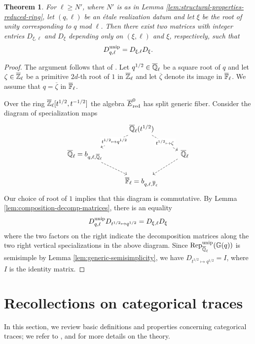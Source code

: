 \documentclass[a4paper, 10pt, oneside, reqno]{amsart}
\theoremstyle{plain}
\newtheorem{thm}{Theorem}[subsection]
\theoremstyle{definition}
\theoremstyle{remark}
\newcommand{\Gbb}{\mathbb{G}}
\begin{document}
\begin{thm}\label{thm:structure-decomposition-matrix}
For $\ell \geq N'$, where $N'$ is as in Lemma \ref{lem:structural-properties-reduced-ring}, let $(q,\ell)$ be an étale realization datum and let $\xi$ be the root of unity corresponding to $q$ mod $\ell$. Then there exist two matrices with integer entries $D_{\xi,\ell}$ and $D_{\xi}$ depending only on $(\xi, \ell)$ and $\xi$, respectively, such that 
$$D_{q, \ell}^{\mathrm{unip}} = D_{\xi,\ell}D_{\xi}.$$
\end{thm} 

\begin{proof}
The argument follows that of \cite[Example 3.2]{GeckHeckeAlgRootOfUnity}. Let $q^{1/2} \in \overline{\mathbb{Q}}_{\ell}$ be a square root of $q$ and let $\zeta \in \overline{\mathbb{Z}}_{\ell}$ be a primitive $2d$-th root of $1$ in $\overline{\mathbb{Z}}_{\ell}$ and let $\overline{\zeta}$ denote its image in $\overline{\mathbb{F}}_{\ell}$. We assume that $q = \overline{\zeta}$ in $\overline{\mathbb{F}}_{\ell}$.

Over the ring $\overline{\mathbb{Z}}_{\ell}[t^{1/2}, t^{-1/2}]$ the algebra $\overline{E}^0_{\mathrm{red}}$ has split generic fiber. Consider the diagram of specialization maps 
\[\begin{tikzcd}
	& {\Qlb(t^{1/2})} & \\
	{\Qlb = b_{q,\ell,\Qlb}} && \Qlb \\
	& {\Flb = b_{q,\ell, \Flb}}
	\arrow["{t^{1/2}\mapsto q^{1/2}}"{description}, dashed, from=1-2, to=2-1]
	\arrow["{t^{1/2} \mapsto \zeta}"{description}, dashed, from=1-2, to=2-3]
	\arrow[dashed, from=2-1, to=3-2]
	\arrow[dashed, from=2-3, to=3-2]
\end{tikzcd}\]
Our choice of root of $1$ implies that this diagram is commutative. By Lemma \ref{lem:composition-decomp-matrices}, there is an equality 
$$D^{\mathrm{unip}}_{q,\ell}D_{t^{1/2} \mapsto q^{1/2}} = D_{\xi,\ell}D_{\xi}$$
where the two factors on the right indicate the decomposition matrices along the two right vertical specializations in the above diagram. Since $\Rep^{\unip}_{\Qlb}(\Gbb(q))$ is semisimple by Lemma \ref{lem:generic-semisimplicity}, we have $D_{t^{1/2} \mapsto q^{1/2}} = I$, where $I$ is the identity matrix. 
\end{proof}

\appendix

\section{Recollections on categorical traces}\label{appendix:recollection-categorical-traces}

In this section, we review basic definitions and properties concerning categorical traces; we refer to \cite[Section 3]{ToyModel}, \cite[Section 7]{ZhuCategoricalTame} and \cite{HSS} for more details on the theory. 
\end{document}
